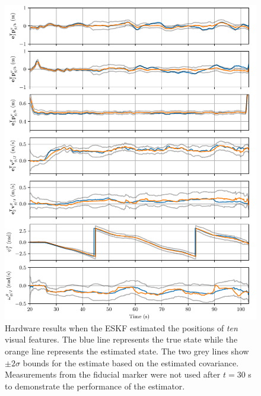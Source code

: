 \begin{figure}
  \centering
  \includegraphics[width=6.5in]{plots/hardware_results}
  \caption[ESKF Hardware Results Using Ten Visual Features]{Hardware results when
    the ESKF estimated the positions of \emph{ten} visual
  features. The blue line represents the true state while the orange line
  represents the estimated state. The two grey lines show $\pm 2 \sigma$ bounds for
  the estimate based on the estimated covariance. Measurements from the fiducial
  marker were not used after $t = 30$ s to demonstrate the performance of the estimator.}
  \label{fig:est_hardware}
\end{figure}

